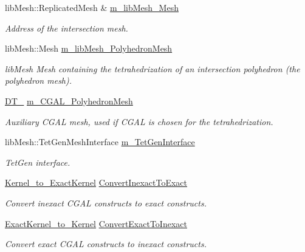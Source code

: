 \begin{DoxyCompactItemize}
lib\+Mesh\+::\+Replicated\+Mesh \& \hyperlink{classcarl_1_1_mesh___intersection_aeea7835637a936ca4f272e48cea18fa2}{m\+\_\+lib\+Mesh\+\_\+\+Mesh}
\begin{DoxyCompactList}\small\item\em Address of the intersection mesh. \end{DoxyCompactList}\item 
lib\+Mesh\+::\+Mesh \hyperlink{classcarl_1_1_mesh___intersection_a4377fd67cf7c486ba4263fe11b99a3cf}{m\+\_\+lib\+Mesh\+\_\+\+Polyhedron\+Mesh}
\begin{DoxyCompactList}\small\item\em lib\+Mesh Mesh containing the tetrahedrization of an intersection polyhedron (the polyhedron mesh). \end{DoxyCompactList}\item 
\hyperlink{_c_g_a_l__typedefs_8h_a36cae79a8ab0b5a4edc662fdb8821ba9}{D\+T\+\_} \hyperlink{classcarl_1_1_mesh___intersection_a256506b058cda4c9b767d14277b9650c}{m\+\_\+\+C\+G\+A\+L\+\_\+\+Polyhedron\+Mesh}
\begin{DoxyCompactList}\small\item\em Auxiliary C\+G\+A\+L mesh, used if C\+G\+A\+L is chosen for the tetrahedrization. \end{DoxyCompactList}\item 
lib\+Mesh\+::\+Tet\+Gen\+Mesh\+Interface \hyperlink{classcarl_1_1_mesh___intersection_a670d0e1f635a8fd820fb659c4c073c0e}{m\+\_\+\+Tet\+Gen\+Interface}
\begin{DoxyCompactList}\small\item\em Tet\+Gen interface. \end{DoxyCompactList}\item 
\hyperlink{_c_g_a_l__typedefs_8h_a7fee49db11d7ad002fa79aedabf4d2cc}{Kernel\+\_\+to\+\_\+\+Exact\+Kernel} \hyperlink{classcarl_1_1_mesh___intersection_a9b682296131536eb588bcee3d7f253b1}{Convert\+Inexact\+To\+Exact}
\begin{DoxyCompactList}\small\item\em Convert inexact C\+G\+A\+L constructs to exact constructs. \end{DoxyCompactList}\item 
\hyperlink{_c_g_a_l__typedefs_8h_aa71268402de3c241e32cd09e20cbe44c}{Exact\+Kernel\+\_\+to\+\_\+\+Kernel} \hyperlink{classcarl_1_1_mesh___intersection_ac80b6a1094d5268d646150d1f5e61560}{Convert\+Exact\+To\+Inexact}
\begin{DoxyCompactList}\small\item\em Convert exact C\+G\+A\+L constructs to inexact constructs. \end{DoxyCompactList}\item 

\end{DoxyCompactItemize}
